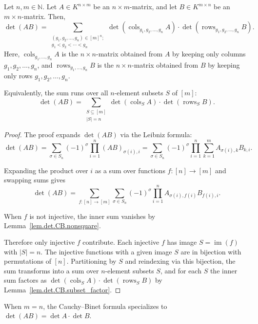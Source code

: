 \begin{theorem}
\label{thm.det.CB}
\leantarget
\leanok
Let $n,m\in\mathbb{N}$. Let $A\in K^{n\times m}$ be an $n\times m$-matrix,
and let $B\in K^{m\times n}$ be an $m\times n$-matrix. Then,
\[
\det(AB) = \sum_{\substack{(g_1,g_2,\ldots,g_n)\in [m]^n;\\
g_1<g_2<\cdots<g_n}}
\det(\operatorname{cols}_{g_1,g_2,\ldots,g_n} A)
\cdot \det(\operatorname{rows}_{g_1,g_2,\ldots,g_n} B).
\]
Here, $\operatorname{cols}_{g_1,\ldots,g_n} A$ is the $n\times n$-matrix
obtained from $A$ by keeping only columns $g_1,g_2,\ldots,g_n$, and
$\operatorname{rows}_{g_1,\ldots,g_n} B$ is the $n\times n$-matrix
obtained from $B$ by keeping only rows $g_1,g_2,\ldots,g_n$.

Equivalently, the sum runs over all
$n$-element subsets $S$ of $[m]$:
\[
\det(AB) = \sum_{\substack{S \subseteq [m] \\ |S|=n}}
\det(\operatorname{cols}_S A) \cdot \det(\operatorname{rows}_S B).
\]
\end{theorem}

\begin{proof}

The proof expands $\det(AB)$ via the Leibniz formula:
\[
\det(AB) = \sum_{\sigma\in S_n} (-1)^{\sigma}
\prod_{i=1}^n (AB)_{\sigma(i),i}
= \sum_{\sigma\in S_n} (-1)^{\sigma}
\prod_{i=1}^n \sum_{k=1}^m A_{\sigma(i),k} B_{k,i}.
\]

Expanding the product over $i$ as a sum over functions
$f\colon [n]\to[m]$ and swapping sums gives
\[
\det(AB) = \sum_{f\colon [n]\to [m]}
\sum_{\sigma\in S_n} (-1)^{\sigma}
\prod_{i=1}^n A_{\sigma(i),f(i)} B_{f(i),i}.
\]

When $f$ is not injective, the inner sum vanishes by
Lemma~\ref{lem.det.CB.nonsquare}.

Therefore only injective $f$ contribute. Each injective $f$ has image
$S = \operatorname{im}(f)$ with $|S|=n$. The injective functions with
a given image $S$ are in bijection with permutations of $[n]$.
Partitioning by $S$ and reindexing via this bijection,
the sum transforms into a sum over $n$-element subsets $S$, and
for each $S$ the inner sum factors as
$\det(\operatorname{cols}_S A)\cdot \det(\operatorname{rows}_S B)$
by Lemma~\ref{lem.det.CB.subset_factor}.
\end{proof}

\begin{theorem}
\label{thm.det.CB.square}
\leanhelper
\leanok
When $m=n$, the Cauchy--Binet formula specializes to
$\det(AB) = \det A \cdot \det B$.
\end{theorem}

